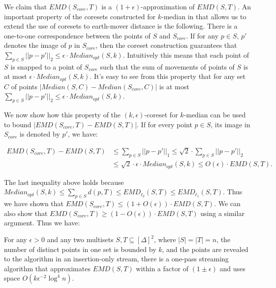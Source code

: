 \documentclass[oribibl]{llncs}
\begin{document}
We claim that $EMD(S_{core}, T)$ is a $(1+\epsilon)$-approximation
of $EMD(S,T)$. An important property of the coresets constructed for 
$k$-median in \cite{kcoreset} that allows us to extend the use of
coresets to earth-mover distance is the following. There is a
one-to-one correspondence between the points of $S$ and $S_{core}$.
If for any $p\in S$, $p'$ denotes the image of $p$ in $S_{core}$,
then the coreset construction guarantees that
$\sum_{p\in S}||p-p'||_2 \le \epsilon\cdot Median_{opt}(S,k)$.
Intuitively this means that each point of $S$ is snapped to
a point of $S_{core}$ such that the sum of movements of points
of $S$ is at most $\epsilon\cdot Median_{opt}(S,k)$. It's easy to
see from this property that for any set $C$ of points
$|Median(S,C)-Median(S_{core},C)|$ is at most
$\sum_{p\in S}||p-p'||_2 \le \epsilon\cdot Median_{opt}(S,k)$.

We now show how this property of the $(k,\epsilon)$-coreset
for $k$-median can be used to bound $|EMD(S_{core},T) - EMD(S,T)|$.
If for every point
$p\in S$, its image in $S_{core}$ is denoted by $p'$, we have: 

\begin{align*}
EMD(S_{core},T) - EMD(S,T) 
 &\le \sum_{p\in S}||p-p'||_1\le \sqrt{2}\cdot \sum_{p\in S}||p-p'||_2 \\
 &\le \sqrt{2}\cdot \epsilon\cdot Median_{opt}(S,k)\le O(\epsilon)\cdot EMD(S,T).
\end{align*}

The last inequality above holds because
$Median_{opt}(S,k) \le \sum_{p\in S} d(p, T)\le EMD_{\ell_2}(S,T)\le EMD_{\ell_1}(S,T)$.
Thus we have shown that $EMD(S_{core},T) \le (1+O(\epsilon))\cdot EMD(S,T)$.
We can also show that 
$EMD(S_{core},T) \ge (1-O(\epsilon))\cdot EMD(S,T)$
using a similar argument. Thus we have:

\begin{theorem}
For any $\epsilon>0$ and any two multisets $S,T\subseteq[\Delta]^2$, where
$|S|=|T|=n$, the number of distinct points in one set is bounded by $k$,
and the points are revealed to the algorithm in an insertion-only stream,
there is a one-pass streaming algorithm that approximates
$EMD(S,T)$ within a factor of $(1\pm\epsilon)$ and uses space
$O(k\epsilon^{-2}\log^{4}n)$.
\end{theorem}
\end{document}
